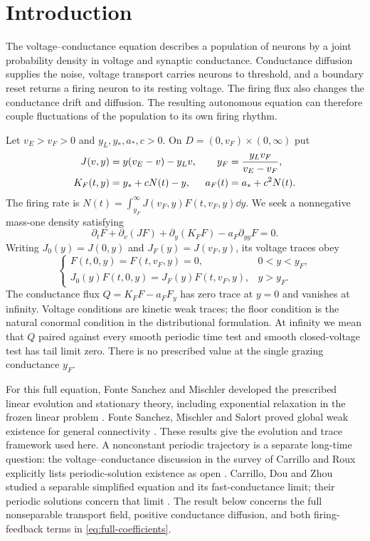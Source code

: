 \section{Introduction}

The voltage--conductance equation describes a population of neurons
by a joint probability density in voltage and synaptic conductance.
Conductance diffusion supplies the noise, voltage transport carries
neurons to threshold, and a boundary reset returns a firing neuron
to its resting voltage. The firing flux also changes the conductance
drift and diffusion. The resulting autonomous equation can therefore
couple fluctuations of the population to its own firing rhythm.

Let $v_E>v_F>0$ and $y_L,y_*,a_*,c>0$. On
$D=(0,v_F)\times(0,\infty)$ put
\begin{align}\label{eq:full-coefficients}
 J(v,y)&=y(v_E-v)-y_Lv,&
 y_F&=\frac{y_Lv_F}{v_E-v_F},\notag\\
 K_F(t,y)&=y_*+cN(t)-y,& a_F(t)&=a_*+c^2N(t).
\end{align}
The firing rate is
$N(t)=\int_{y_F}^\infty J(v_F,y)F(t,v_F,y)\dd y$.
We seek a nonnegative mass-one density satisfying
\begin{equation}\label{eq:full-equation}
 \partial_tF+\partial_v(JF)+\partial_y(K_FF)-a_F\partial_{yy}F=0 .
\end{equation}
Writing $J_0(y)=J(0,y)$ and $J_F(y)=J(v_F,y)$, its voltage
traces obey
\begin{equation}\label{eq:full-voltage-boundaries}
 \begin{cases}
  F(t,0,y)=F(t,v_F,y)=0,&0<y<y_F,\\
  J_0(y)F(t,0,y)=J_F(y)F(t,v_F,y),&y>y_F.
 \end{cases}
\end{equation}
The conductance flux $Q=K_FF-a_FF_y$ has zero trace at $y=0$
and vanishes at infinity.
Voltage conditions are kinetic weak traces; the floor condition is
the natural conormal condition in the distributional formulation.
At infinity we mean that $Q$ paired against every smooth periodic
time test and smooth closed-voltage test has tail limit zero.
There is no prescribed value at the single grazing conductance $y_F$.

For this full equation, Fonte Sanchez and Mischler developed the
prescribed linear evolution and stationary theory, including
exponential relaxation in the frozen linear problem
\cite[Theorems 1.2 and 2.2]{FM24}. Fonte Sanchez, Mischler and Salort
proved global weak existence for general connectivity
\cite[Theorem 1.1 and Definition 4.1]{FMS26}. These results give
the evolution and trace framework used here. A nonconstant
periodic trajectory is a separate long-time question:
the voltage--conductance discussion in the survey of Carrillo
and Roux explicitly lists periodic-solution existence as open
\cite[Section 7.6]{CR25}. Carrillo, Dou and Zhou studied a
separable simplified equation and its fast-conductance limit;
their periodic solutions concern that limit
\cite[Section 4]{CDZ22}. The result below concerns the full
nonseparable transport field, positive conductance diffusion,
and both firing-feedback terms in \eqref{eq:full-coefficients}.

